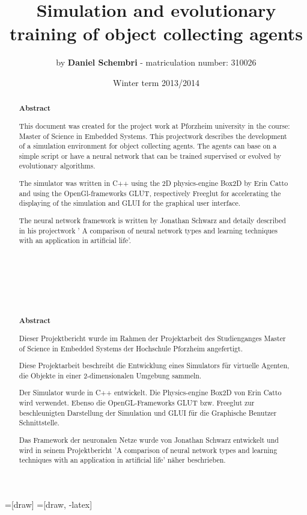 \documentclass[10pt,a4paper,DIV=11]{scrreprt}
\title
{
    Simulation and evolutionary training of object collecting agents\\
}
\author
{
    by \textbf{Daniel Schembri} - matriculation number: 310026
}
\date
{
    Winter term 2013/2014
}
\begin{document}
=[draw]
=[draw, -latex] 


\maketitle
\thispagestyle{empty}
\newpage
{\large\tableofcontents}
\newpage

% 
%
%
%
%
\begin{abstract} 
\huge{\textbf{Abstract}} \\

\normalsize

This document was created for the project work at Pforzheim university in the course: Master of Science in Embedded Systems. 
This projectwork describes the development of a simulation environment for object collecting agents. The agents can base on a simple script or have a neural network that can be trained supervised or evolved by evolutionary algorithms.

The simulator was written in C++ using the 2D physics-engine Box2D by Erin Catto and using the OpenGl-frameworks GLUT, respectively Freeglut for accelerating the displaying of the simulation and GLUI for the graphical user interface. 

The neural network framework is written by Jonathan Schwarz and detaily described in his projectwork ' A comparison of neural network types and learning techniques with an application in artificial life'. \\ \\ \\ \\ \\ \\ \\ \\

\huge{\textbf{Abstract}} \\

\normalsize

Dieser Projektbericht wurde im Rahmen der Projektarbeit des Studienganges Master of Science in Embedded Systems der Hochschule Pforzheim angefertigt. 

Diese Projektarbeit beschreibt die Entwicklung eines Simulators für virtuelle Agenten, die Objekte in einer 2-dimensionalen Umgebung sammeln. 

Der Simulator wurde in C++ entwickelt. Die Physics-engine Box2D von Erin Catto wird verwendet. Ebenso die OpenGL-Frameworks GLUT bzw. Freeglut zur beschleunigten Darstellung der Simulation und GLUI für die Graphische Benutzer Schnittstelle. 

Das Framework der neuronalen Netze wurde von Jonathan Schwarz entwickelt und wird in seinem Projektbericht 'A comparison of neural network types and learning techniques with an application in artificial life' näher beschrieben.
	
	
\end{abstract}
\end{document}
